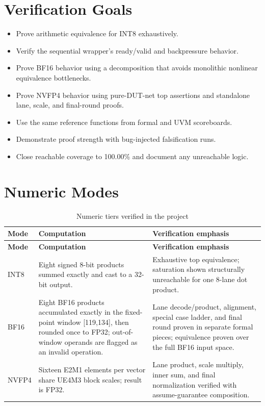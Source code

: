 \documentclass[11pt,oneside]{report}
\begin{document}
\section{Verification Goals}

\begin{itemize}
  \item Prove arithmetic equivalence for INT8 exhaustively.
  \item Verify the sequential wrapper's ready/valid and backpressure behavior.
  \item Prove BF16 behavior using a decomposition that avoids monolithic
        nonlinear equivalence bottlenecks.
  \item Prove NVFP4 behavior using pure-DUT-net top assertions and standalone
        lane, scale, and final-round proofs.
  \item Use the same reference functions from formal and UVM scoreboards.
  \item Demonstrate proof strength with bug-injected falsification runs.
  \item Close reachable coverage to 100.00\% and document any unreachable logic.
\end{itemize}

\section{Numeric Modes}

\begin{longtable}{p{}p{}p{}}
\caption{Numeric tiers verified in the project}\\
\toprule
\textbf{Mode} & \textbf{Computation} & \textbf{Verification emphasis} \\
\midrule
\endfirsthead
\toprule
\textbf{Mode} & \textbf{Computation} & \textbf{Verification emphasis} \\
\midrule
\endhead
INT8 & Eight signed 8-bit products summed exactly and cast to a 32-bit output. &
Exhaustive top equivalence; saturation shown structurally unreachable for one
8-lane dot product. \\
BF16 & Eight BF16 products accumulated exactly in the fixed-point window
[119,134], then rounded once to FP32; out-of-window operands are flagged as an
invalid operation. & Lane decode/product, alignment, special case ladder, and
final round proven in separate formal pieces; equivalence proven over the full
BF16 input space. \\
NVFP4 & Sixteen E2M1 elements per vector share UE4M3 block scales; result is
FP32. & Lane product, scale multiply, inner sum, and final normalization
verified with assume-guarantee composition. \\
\bottomrule
\end{longtable}
\end{document}

